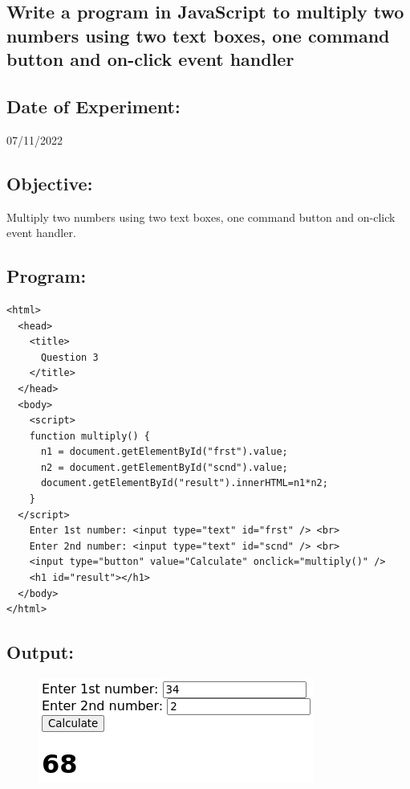 \documentclass[12pt, a4paper]{article}
\begin{document}
\pagebreak

\begin{tcolorbox}
  \section{Write a program in JavaScript to multiply two numbers using two text boxes, one command button and on-click event handler}
\end{tcolorbox}
\subsection*{Date of Experiment:}
07/11/2022
\subsection*{Objective:}
Multiply two numbers using two text boxes, one command button and on-click event handler.

\subsection*{Program:}
\begin{lstlisting}
<html>
  <head>
    <title>
      Question 3
    </title>
  </head>
  <body>
    <script>
    function multiply() {
      n1 = document.getElementById("frst").value;
      n2 = document.getElementById("scnd").value;
      document.getElementById("result").innerHTML=n1*n2;
    }
  </script>
    Enter 1st number: <input type="text" id="frst" /> <br>
    Enter 2nd number: <input type="text" id="scnd" /> <br>
    <input type="button" value="Calculate" onclick="multiply()" /> 
    <h1 id="result"></h1>
  </body>
</html>
\end{lstlisting}
\pagebreak
\subsection*{Output:}
\begin{figure}[ht]
  \centering
  \includegraphics{5}
\end{figure}

\pagebreak
\end{document}
